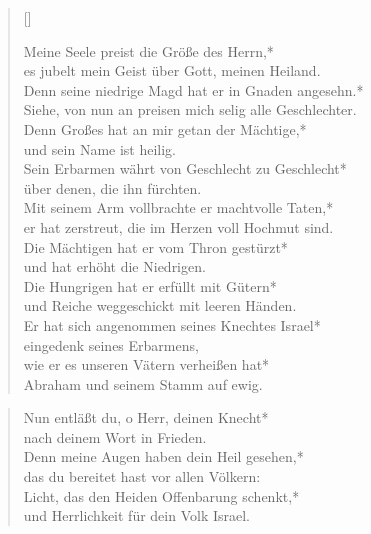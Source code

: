\vspace{0.6cm}




\begin{verse}[\versewidth]
 
Meine Seele preist die Größe des Herrn,*\\
es jubelt mein Geist über Gott, meinen Heiland.\\
\vin Denn seine niedrige Magd hat er in Gnaden angesehn.*\\
\vin Siehe, von nun an preisen mich selig alle Geschlechter.\\
Denn Großes hat an mir getan der Mächtige,*\\
und sein Name ist heilig.\\
\vin Sein Erbarmen währt von Geschlecht zu Geschlecht*\\
\vin über denen, die ihn fürchten.\\

Mit seinem Arm vollbrachte er machtvolle Taten,*\\
er hat zerstreut, die im Herzen voll Hochmut sind.\\
\vin Die Mächtigen hat er vom Thron gestürzt*\\
\vin und hat erhöht die Niedrigen.\\
Die Hungrigen hat er erfüllt mit Gütern*\\
und Reiche weggeschickt mit leeren Händen.\\
\vin Er hat sich angenommen seines Knechtes Israel*\\
\vin eingedenk seines Erbarmens,\\
wie er es unseren Vätern verheißen hat*\\
Abraham und seinem Stamm auf ewig.\\
\end{verse}

\vspace{0.6cm}



\begin{verse}
 
Nun entläßt du, o Herr, deinen Knecht*\\
nach deinem Wort in Frieden.\\
\vin Denn meine Augen haben dein Heil gesehen,*\\
\vin das du bereitet hast vor allen Völkern:\\
Licht, das den Heiden Offenbarung schenkt,*\\
und Herrlichkeit für dein Volk Israel.\\
\end{verse}









